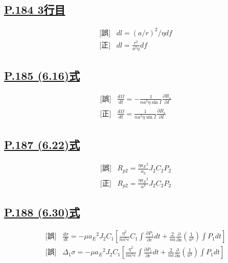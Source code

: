 \documentclass[9pt,fleqn]{bxjsarticle}
\begin{document}
\subsection*{\underline{P.184 3行目}}
\begin{align*}
    &\text{[誤]} \hspace{10pt} dl = (a/r)^2/{\eta}df　\\
    &\text{[正]} \hspace{10pt} dl = \frac{r^2}{a^2\eta}df 
\end{align*}

\subsection*{\underline{P.185 (6.16)式}}
\begin{align*}
    &\text{[誤]} \hspace{10pt} \frac{d\Omega}{dt} = -\frac{1}{na^2\eta\sin{I}}\frac{\partial{R_s}}{\partial{I}} \\
    &\text{[正]} \hspace{10pt} \frac{d\Omega}{dt} = \frac{1}{na^2\eta\sin{I}}\frac{\partial{R_s}}{\partial{I}} 
\end{align*}

\subsection*{\underline{P.187 (6.22)式}}
\begin{align*}
    &\text{[誤]} \hspace{10pt} R_{p2} = \frac{\eta{a_E}^2}{a_3}J_2C_2P_2 \\
    &\text{[正]} \hspace{10pt} R_{p2} = \frac{\eta{a_E}^2}{a^3}J_2C_2P_2  
\end{align*}

\subsection*{\underline{P.188 (6.30)式}}
\begin{align*}
    &\text{[誤]} \hspace{10pt} \frac{d\sigma}{dt} = -\mu{a_E}^2J_2C_1\left[\frac{\eta^2}{na^5e}C_1\int\frac{\partial{P_1}}{\partial{e}}dt
    + \frac{2}{na}\frac{\partial}{\partial{a}}\left(\frac{1}{a^3}\right){\int}P_1dt\right] \\
    &\text{[誤]} \hspace{10pt} \varDelta_1\sigma = -\mu{a_E}^2J_2C_1\left[\frac{\eta^2}{na^5e}{\int}\frac{\partial{P_1}}{\partial{e}}dt
    + \frac{2}{na}\frac{\partial}{\partial{a}}\left(\frac{1}{a^3}\right){\int}P_1dt\right] 
\end{align*}
\end{document}
